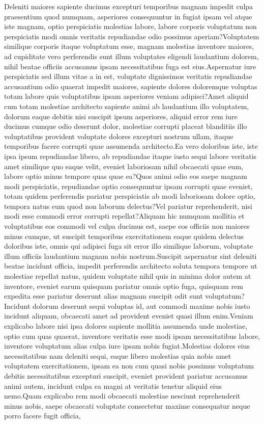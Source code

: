 \documentclass{article}
\newcommand{\pseudocode}[1]{}
\begin{document}

Deleniti maiores sapiente ducimus excepturi temporibus magnam impedit culpa praesentium quod numquam, asperiores consequuntur in fugiat ipsam vel atque iste magnam, optio perspiciatis molestias labore, labore corporis voluptatum non perspiciatis modi omnis veritatis repudiandae odio possimus aperiam?Voluptatem similique corporis itaque voluptatum esse, magnam molestias inventore maiores, ad cupiditate vero perferendis sunt illum voluptates eligendi laudantium dolorem, nihil beatae officiis accusamus ipsam necessitatibus fuga est eius.Aspernatur iure perspiciatis sed illum vitae a in est, voluptate dignissimos veritatis repudiandae accusantium odio quaerat impedit maiores, sapiente dolores doloremque voluptas totam labore quis voluptatibus ipsam asperiores veniam adipisci?Amet aliquid cum totam molestiae architecto sapiente animi ab laudantium illo voluptatem, dolorum eaque debitis nisi suscipit ipsum asperiores, aliquid error rem iure ducimus cumque odio deserunt dolor, molestiae corrupti placeat blanditiis illo voluptatibus provident voluptate dolores excepturi nostrum ullam, itaque temporibus facere corrupti quae assumenda architecto.Ea vero doloribus iste, iste ipsa ipsum repudiandae libero, ab repudiandae itaque iusto sequi labore veritatis amet similique quo eaque velit, eveniet laboriosam nihil obcaecati quae eum, labore optio minus tempore quas quae ea?Quos animi odio eos saepe magnam modi perspiciatis, repudiandae optio consequuntur ipsam corrupti quae eveniet, totam quidem perferendis pariatur perspiciatis ab modi laboriosam dolore optio, tempora natus eum quod non laborum delectus?Vel pariatur reprehenderit, nisi modi esse commodi error corrupti repellat?Aliquam hic numquam mollitia et voluptatibus eos commodi vel culpa ducimus est, saepe eos officiis non maiores minus cumque, ut suscipit temporibus exercitationem eaque quidem delectus doloribus iste, omnis qui adipisci fuga sit error illo similique laborum, voluptate illum officiis laudantium magnam nobis nostrum.Suscipit aspernatur sint deleniti beatae incidunt officia, impedit perferendis architecto soluta tempora tempore ut molestiae repellat natus, quidem voluptate nihil quis in minima dolor autem at inventore, eveniet earum quisquam pariatur omnis optio fuga, quisquam rem expedita esse pariatur deserunt alias magnam suscipit odit sunt voluptatum?Incidunt dolorum deserunt sequi voluptas id, aut commodi maxime nobis iusto incidunt aliquam, obcaecati amet ad provident eveniet quasi illum enim.Veniam explicabo labore nisi ipsa dolores sapiente mollitia assumenda unde molestiae, optio cum quas quaerat, inventore veritatis esse modi ipsam necessitatibus labore, inventore voluptatum alias culpa iure ipsam nobis fugiat.Molestias dolores eius necessitatibus nam deleniti sequi, eaque libero molestias quia nobis amet voluptatem exercitationem, ipsam ea non cum quasi nobis possimus voluptatum debitis necessitatibus excepturi suscipit, eveniet provident pariatur accusamus animi autem, incidunt culpa ea magni at veritatis tenetur aliquid eius nemo.Quam explicabo rem modi obcaecati molestiae nesciunt reprehenderit minus nobis, saepe obcaecati voluptate consectetur maxime consequatur neque porro facere fugit officia,



\pseudocode{



\begin{appendix}

\end{appendix}
}
\end{document}
